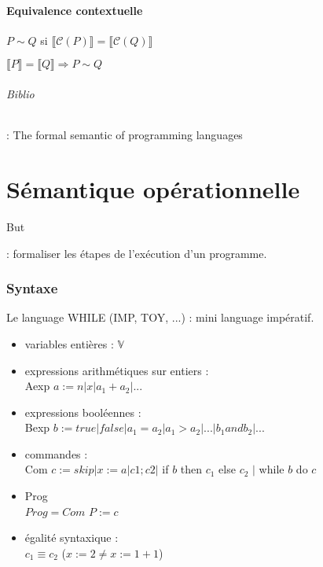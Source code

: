 \documentclass[10pt,a4paper]{article}
\newcommand{\semm}[1]{\llbracket #1 \rrbracket }
\begin{document}
\subsection{Equivalence contextuelle}
$P \sim Q$ si $\semm{\mathcal{C}(P)} = \semm{\mathcal{C}(Q)}$
\begin{propriete}[Compostionnalité] 
$\semm{P} = \semm{Q}  \Rightarrow P \sim Q$
\end{propriete}
\paragraph{Biblio} :
The formal semantic of programming languages

\part{Sémantique opérationnelle}

\subparagraph{But} : formaliser les étapes de l'exécution d'un programme.

\section{Syntaxe}
Le language WHILE (IMP, TOY, ...) : mini language impératif.
\begin{itemize}
\item variables entières : $\mathbb{V}$
\item expressions arithmétiques sur entiers : \\
Aexp $ a := n \vert x \vert a_1 + a_2 \vert ...$
\item expressions booléennes : \\
Bexp $ b := true | false | a_1 = a_2 | a_1 > a_2 | ... | b_1 and b_2 | ...$
\item commandes : \\
Com $c := skip \vert x := a | c1; c2 |$ if $b$ then $c_1$ else $c_2$ $|$ while $b$ do $c$
\item Prog \\
$Prog = Com$ $P := c$
\item égalité syntaxique : \\
$c_1 \equiv c_2$ ($x := 2 \neq x := 1 + 1$)
\end{itemize}
\end{document}
